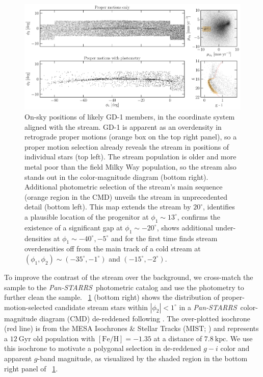 \documentclass[modern]{aastex62}
\newcommand{\pans}{\textsl{Pan-STARRS}}
\newcommand{\kpc}{\textrm{kpc}}
\newcommand{\feh}{\ensuremath{[\textrm{Fe} / \textrm{H}]}}
\begin{document}
\begin{figure}
\begin{center}
\includegraphics[width=\textwidth]{gd1_sample.pdf}
\end{center}
\caption{
On-sky positions of likely GD-1 members, in the coordinate system aligned with the stream.
GD-1 is apparent as an overdensity in retrograde proper motions (orange box on the top right panel), so a proper motion selection already reveals the stream in positions of individual stars (top left).
The stream population is older and more metal poor than the field Milky Way population, so the stream also stands out in the color-magnitude diagram (bottom right).
Additional photometric selection of the stream's main sequence (orange region in the CMD) unveils the stream in unprecedented detail (bottom left).
This map extends the stream by $20^\circ$, identifies a plausible location of the progenitor at $\phi_1\sim13^\circ$, confirms the existence of a significant gap at $\phi_1\sim-20^\circ$, shows additional under-densities at $\phi_1\sim-40^\circ,-5^\circ$ and for the first time finds stream overdensities off from the main track of a cold stream at $(\phi_1,\phi_2)\sim(-35^\circ,-1^\circ)$ and $(-15^\circ,-2^\circ)$.
}
\label{fig:selection}
\end{figure}

To improve the contrast of the stream over the background, we cross-match the
sample to the \pans\ photometric catalog and use the photometry to further clean
the sample.
\figurename~\ref{fig:selection} (bottom right) shows the distribution of
proper-motion-selected candidate stream stars within $\left|\phi_2\right| <
1^\circ$ in a \pans\ color-magnitude diagram (CMD) de-reddened following \citet{Schlafly:2011}.
The over-plotted isochrone (red line) is from the MESA Isochrones \& Stellar
Tracks (MIST; \citealt{Dotter:2016, Choi:2016, Paxton:2011}) and represents a
$12~\textrm{Gyr}$ old population with $\feh = -1.35$ at a distance of
$7.8~\kpc$.
We use this isochrone to motivate a polygonal selection in de-reddened $g-i$
color and apparent $g$-band magnitude, as visualized by the shaded region in the
bottom right panel of \figurename~\ref{fig:selection}.
\end{document}
